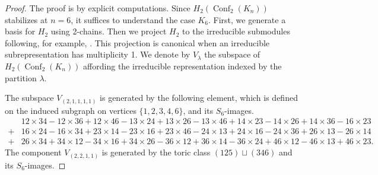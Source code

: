 \documentclass[12pt]{amsart}
\theoremstyle{definition}
\newcommand{\conf}{\operatorname{Conf}}
\begin{document}
\begin{proof}
The proof is by explicit computations. Since $H_2(\conf_2(K_n))$ stabilizes at $n=6$, it suffices to understand the case $K_6$. First, we generate a basis for $H_2$ using 2-chains. Then we project $H_2$ to the irreducible submodules following, for example, \cite[Section 2.7]{Serre1977}. This projection is canonical when an irreducible subrepresentation has multiplicity 1. We denote by $V_\lambda$ the subspace of $H_2(\conf_2(K_n))$ affording the irreducible representation indexed by the partition $\lambda$.

The subspace $V_{(2,1,1,1,1)}$ is generated by the following element, which is defined on the induced subgraph on vertices $\{1,2,3,4,6\}$, and its $S_6$-images.{\footnotesize \begin{align*} 
&{12} \times {34}
- {12} \times {36}
+{12} \times {46}
- {13} \times {24}
+{13} \times {26}
- {13} \times {46}
+{14} \times {23}
- {14} \times {26}
+{14} \times {36}
- {16} \times {23}\\
+&{16} \times {24}
- {16} \times {34}
+{23} \times {14}
- {23} \times {16}
+{23} \times {46}
- {24} \times {13}
+{24} \times {16}
- {24} \times {36}
+{26} \times {13}
- {26} \times {14}\\
+&{26} \times {34}
+{34} \times {12}
- {34} \times {16}
+{34} \times {26}
- {36} \times {12}
+{36} \times {14}
- {36} \times {24}
+{46} \times {12}
- {46} \times {13}
+{46} \times {23}.
\end{align*}}The component $V_{(2,2,1,1)}$ is generated by the toric class $(125)\sqcup (346)$ and its $S_6$-images.


\end{proof}
\end{document}
